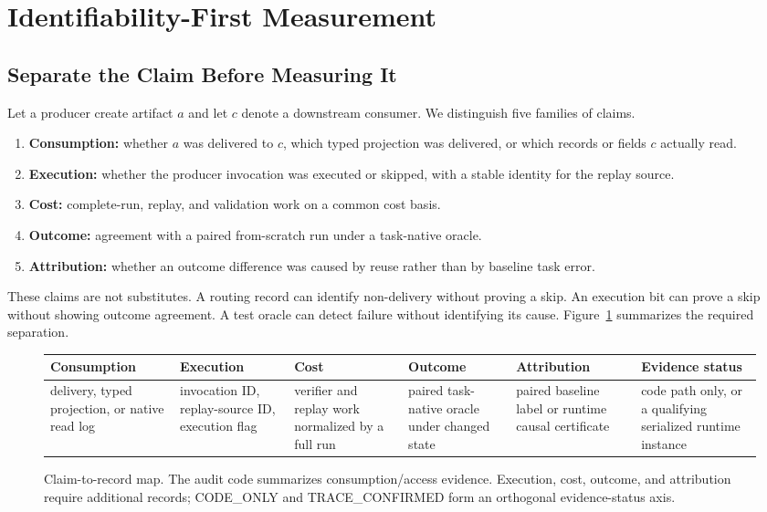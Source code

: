 \documentclass[letterpaper]{article} %
\begin{document}
\section{Identifiability-First Measurement}

\subsection{Separate the Claim Before Measuring It}

Let a producer create artifact $a$ and let $c$ denote a downstream consumer.
We distinguish five families of claims.

\begin{enumerate}
    \item \textbf{Consumption:} whether $a$ was delivered to $c$, which typed
    projection was delivered, or which records or fields $c$ actually read.
    \item \textbf{Execution:} whether the producer invocation was executed or
    skipped, with a stable identity for the replay source.
    \item \textbf{Cost:} complete-run, replay, and validation work on a common
    cost basis.
    \item \textbf{Outcome:} agreement with a paired from-scratch run under a
    task-native oracle.
    \item \textbf{Attribution:} whether an outcome difference was caused by
    reuse rather than by baseline task error.
\end{enumerate}

These claims are not substitutes. A routing record can identify non-delivery
without proving a skip. An execution bit can prove a skip without showing
outcome agreement. A test oracle can detect failure without identifying its
cause. Figure~\ref{fig:claim-map} summarizes the required separation.

\begin{figure}[t]
\centering
\small
\setlength{\tabcolsep}{4pt}
\begin{tabular}{p{}p{}p{}p{}p{}p{}}
\toprule
\textbf{Consumption} & \textbf{Execution} & \textbf{Cost} & \textbf{Outcome} & \textbf{Attribution} & \textbf{Evidence status} \\
\midrule
delivery, typed projection, or native read log & invocation ID, replay-source ID, execution flag & verifier and replay work normalized by a full run & paired task-native oracle under changed state & paired baseline label or runtime causal certificate & code path only, or a qualifying serialized runtime instance \\
\bottomrule
\end{tabular}
\caption{Claim-to-record map. The audit code summarizes consumption/access
evidence. Execution, cost, outcome, and attribution require additional records;
CODE\_ONLY and TRACE\_CONFIRMED form an orthogonal evidence-status axis.}
\label{fig:claim-map}
\end{figure}
\end{document}
